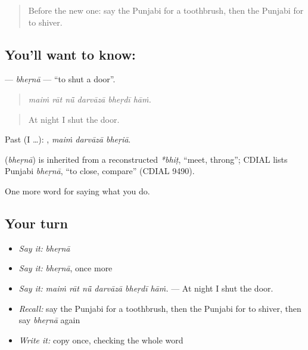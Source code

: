 \label{lesson:PA-C226-bherna}



\begin{quote}
Before the new one: say the Punjabi for a toothbrush, then the Punjabi for to shiver.
\end{quote}

\subsection*{You'll want to know: }
\textbf{} — \emph{bheṛnā} — \textquotedblleft{}to shut a door\textquotedblright{}.

\begin{quote}
     
\end{quote}

\begin{quote}
\emph{maiṁ rāt nū̃ darvāzā bheṛdī hāṁ.}
\end{quote}

\begin{quote}
At night I shut the door.
\end{quote}

Past (I …):   , \emph{maiṁ darvāzā bheṛiā}.

\begin{cousinweb}
\textbf{} (\emph{bheṛnā}) is inherited from a reconstructed \emph{*bhiṭ}, \textquotedblleft{}meet, throng\textquotedblright{}; CDIAL lists Punjabi \emph{bheṛnā}, \textquotedblleft{}to close, compare\textquotedblright{} (CDIAL 9490).
\end{cousinweb}

\begin{grammarlens}[title={What you've built}]
One more word for saying what you do.
\end{grammarlens}

\subsection*{Your turn}
\begin{itemize}
\raggedright
  \item \emph{Say it:} \emph{bheṛnā}
  \item \emph{Say it:} \emph{bheṛnā}, once more
  \item \emph{Say it:} \emph{maiṁ rāt nū̃ darvāzā bheṛdī hāṁ.} — At night I shut the door.
  \item \emph{Recall:} say the Punjabi for a toothbrush, then the Punjabi for to shiver, then say \emph{bheṛnā} again
  \item \emph{Write it:} copy \textbf{} once, checking the whole word
\end{itemize}

